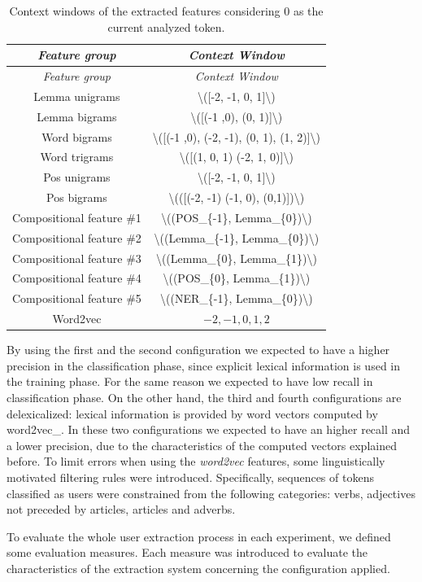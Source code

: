 \documentclass[]{book}
\begin{document}
\begin{longtable}[]{@{}cc@{}}
\caption{\label{tab:feat-confs} Context windows of the extracted features
considering 0 as the current analyzed token.}\tabularnewline
\toprule
\emph{Feature group} & \emph{Context Window}\tabularnewline
\midrule
\endfirsthead
\toprule
\emph{Feature group} & \emph{Context Window}\tabularnewline
\midrule
\endhead
Lemma unigrams & \textbackslash{}({[}-2, -1, 0,
1{]}\textbackslash{})\tabularnewline
Lemma bigrams & \textbackslash{}({[}(-1 ,0), (0,
1){]}\textbackslash{})\tabularnewline
Word bigrams & \textbackslash{}({[}(-1 ,0), (-2, -1), (0, 1), (1,
2){]}\textbackslash{})\tabularnewline
Word trigrams & \textbackslash{}({[}(1, 0, 1) (-2, 1,
0){]}\textbackslash{})\tabularnewline
Pos unigrams & \textbackslash{}({[}-2, -1, 0,
1{]}\textbackslash{})\tabularnewline
Pos bigrams & \textbackslash{}(({[}(-2, -1) (-1, 0),
(0,1){]})\textbackslash{})\tabularnewline
Compositional feature \#1 & \textbackslash{}((POS\_\{-1\},
Lemma\_\{0\})\textbackslash{})\tabularnewline
Compositional feature \#2 & \textbackslash{}((Lemma\_\{-1\},
Lemma\_\{0\})\textbackslash{})\tabularnewline
Compositional feature \#3 & \textbackslash{}((Lemma\_\{0\},
Lemma\_\{1\})\textbackslash{})\tabularnewline
Compositional feature \#4 & \textbackslash{}((POS\_\{0\},
Lemma\_\{1\})\textbackslash{})\tabularnewline
Compositional feature \#5 & \textbackslash{}((NER\_\{-1\},
Lemma\_\{0\})\textbackslash{})\tabularnewline
Word2vec & \(-2, -1, 0, 1, 2\)\tabularnewline
\bottomrule
\end{longtable}

By using the first and the second configuration we expected to have a
higher precision in the classification phase, since explicit lexical
information is used in the training phase. For the same reason we
expected to have low recall in classification phase. On the other hand,
the third and fourth configurations are delexicalized: lexical
information is provided by word vectors computed by word2vec\_. In these
two configurations we expected to have an higher recall and a lower
precision, due to the characteristics of the computed vectors explained
before. To limit errors when using the \emph{word2vec} features, some
linguistically motivated filtering rules were introduced. Specifically,
sequences of tokens classified as users were constrained from the
following categories: verbs, adjectives not preceded by articles,
articles and adverbs.

To evaluate the whole user extraction process in each experiment, we
defined some evaluation measures. Each measure was introduced to
evaluate the characteristics of the extraction system concerning the
configuration applied.
\end{document}
